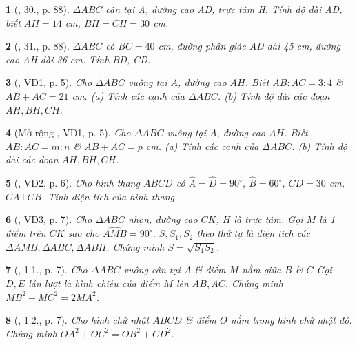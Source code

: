 \documentclass{article}
\newtheorem{baitoan}{}
\begin{document}
\begin{baitoan}[\cite{Binh_Toan_9_tap_1}, 30., p. 88]
	$\Delta ABC$ cân tại A, đường cao AD, trực tâm H. Tính độ dài AD, biết $AH = 14$ {\rm cm}, $BH = CH = 30$ {\rm cm}.
\end{baitoan}

\begin{baitoan}[\cite{Binh_Toan_9_tap_1}, 31., p. 88]
	$\Delta ABC$ có $BC = 40$ {\rm cm}, đường phân giác AD dài {\rm45 cm}, đường cao AH dài {\rm36 cm}. Tính BD, CD.
\end{baitoan}

\begin{baitoan}[\cite{TLCT_THCS_Toan_9_hinh_hoc}, VD1, p. 5]
	Cho $\Delta ABC$ vuông tại $A$, đường cao $AH$. Biết $AB:AC = 3:4$ \& $AB + AC = 21$ \emph{cm}. (a) Tính các cạnh của $\Delta ABC$. (b) Tính độ dài các đoạn $AH,BH,CH$.
\end{baitoan}

\begin{baitoan}[Mở rộng \cite{TLCT_THCS_Toan_9_hinh_hoc}, VD1, p. 5]
	Cho $\Delta ABC$ vuông tại $A$, đường cao $AH$. Biết $AB:AC = m:n$ \& $AB + AC = p$ \emph{cm}. (a) Tính các cạnh của $\Delta ABC$. (b) Tính độ dài các đoạn $AH,BH,CH$.
\end{baitoan}

\begin{baitoan}[\cite{TLCT_THCS_Toan_9_hinh_hoc}, VD2, p. 6]
	Cho hình thang $ABCD$ có $\widehat{A} = \widehat{D} = 90^\circ$, $\widehat{B} = 60^\circ$, $CD = 30$ \emph{cm}, $CA\bot CB$. Tính diện tích của hình thang.
\end{baitoan}

\begin{baitoan}[\cite{TLCT_THCS_Toan_9_hinh_hoc}, VD3, p. 7]
	Cho $\Delta ABC$ nhọn, đường cao $CK$, $H$ là trực tâm. Gọi $M$ là 1 điểm trên $CK$ sao cho $\widehat{AMB} = 90^\circ$. $S,S_1,S_2$ theo thứ tự là diện tích các $\Delta AMB,\Delta ABC,\Delta ABH$. Chứng minh $S = \sqrt{S_1S_2}$.
\end{baitoan}

\begin{baitoan}[\cite{TLCT_THCS_Toan_9_hinh_hoc}, 1.1., p. 7]
	Cho $\Delta ABC$ vuông cân tại $A$ \& điểm $M$ nằm giữa $B$ \& $C$ Gọi $D,E$ lần lượt là hình chiếu của điểm $M$ lên $AB,AC$. Chứng minh $MB^2 + MC^2 = 2MA^2$.
\end{baitoan}

\begin{baitoan}[\cite{TLCT_THCS_Toan_9_hinh_hoc}, 1.2., p. 7]
	Cho hình chữ nhật $ABCD$ \& điểm $O$ nằm trong hình chữ nhật đó. Chứng minh $OA^2 + OC^2 = OB^2 + CD^2$.
\end{baitoan}
\end{document}

